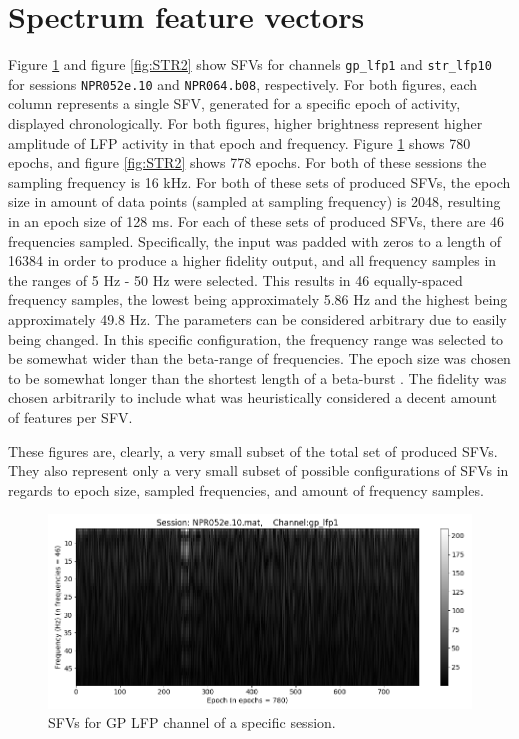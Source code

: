 \documentclass{kththesis}
\begin{document}
\section{Spectrum feature vectors}\label{SFV Results}

Figure \ref{fig:GP1} and figure \ref{fig:STR2} show SFVs for channels \texttt{gp\_lfp1} and \texttt{str\_lfp10} for sessions \texttt{NPR052e.10} and \texttt{NPR064.b08}, respectively. 
For both figures, each column represents a single SFV, generated for a specific epoch of activity, displayed chronologically. 
For both figures, higher brightness represent higher amplitude of LFP activity in that epoch and frequency.
Figure \ref{fig:GP1} shows 780 epochs, and figure \ref{fig:STR2} shows 778 epochs. 
For both of these sessions the sampling frequency is 16 kHz. 
For both of these sets of produced SFVs, the epoch size in amount of data points (sampled at sampling frequency) is 2048, resulting in an epoch size of 128 ms. 
For each of these sets of produced SFVs, there are 46 frequencies sampled. 
Specifically, the input was padded with zeros to a length of 16384 in order to produce a higher fidelity output, and all frequency samples in the ranges of 5 Hz - 50 Hz were selected. 
This results in 46 equally-spaced frequency samples, the lowest being approximately 5.86 Hz and the highest being approximately 49.8 Hz. 
The parameters can be considered arbitrary due to easily being changed.
In this specific configuration, the frequency range was selected to be somewhat wider than the beta-range of frequencies.
The epoch size was chosen to be somewhat longer than the shortest length of a beta-burst \parencite{Cagnan}.
The fidelity was chosen arbitrarily to include what was heuristically considered a decent amount of features per SFV.

These figures are, clearly, a very small subset of the total set of produced SFVs. They also represent only a very small subset of possible configurations of SFVs in regards to epoch size, sampled frequencies, and amount of frequency samples.

\begin{figure}[H]
    \centering
    \centerline{\includegraphics[width=1.1\textwidth]{images/GP1.png}}
    \caption{SFVs for GP LFP channel of a specific session.}
    \label{fig:GP1}
\end{figure}
\end{document}
